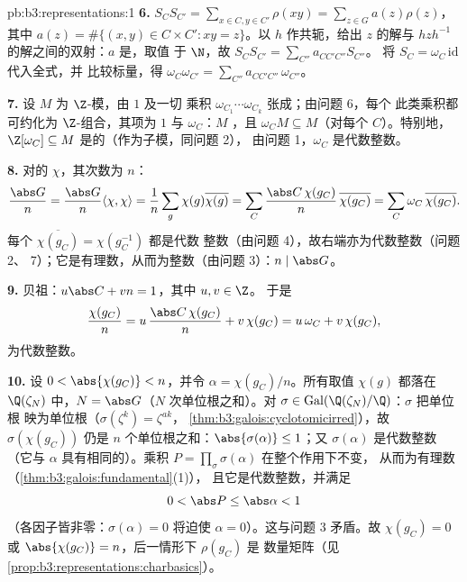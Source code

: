 \begin{solution}{pb:b3:representations:1}
\textbf{6.} $S_CS_{C'} = \sum_{x \in C, y \in C'}\rho(xy) =
\sum_{z \in G} a(z)\rho(z)$，其中 $a(z) = \#\{(x,y) \in C\times
C' : xy = z\}$。以 $h$ 作共轭，给出 $z$ 的解与
$hzh^{-1}$ 的解之间的双射：$a$ 是，取值
于 $\N$，故 $S_CS_{C'} = \sum_{C''}a_{CC'C''}S_{C''}$。
将 $S_C = \omega_C\,\mathrm{id}$ 代入全式，并
比较标量，得
$\omega_C\omega_{C'} = \sum_{C''}a_{CC'C''}\,\omega_{C''}$。

\textbf{7.} 设 $M$ 为 $\Z$-模，由 $1$ 及一切
乘积 $\omega_{C_1}\cdots\omega_{C_k}$ 张成；由问题 6，每个
此类乘积都可约化为 $\Z$-组合，其项为 $1$ 与
$\omega_C$：$M$ ，且 $\omega_C M
\subseteq M$（对每个 $C$）。特别地，$\Z[\omega_C]
\subseteq M$ 是的（作为子模，同问题 2），
由问题 1，$\omega_C$ 是代数整数。

\textbf{8.} 对的 $\chi$，其次数为 $n$：
\[
\frac{\abs G}{n} = \frac{\abs G}{n}\langle\chi,\chi\rangle
= \frac1n \sum_{g}\chi(g)\overline{\chi(g)}
= \sum_{C}\frac{\abs C\,\chi(g_C)}{n}\,\overline{\chi(g_C)}
= \sum_C \omega_C\,\overline{\chi(g_C)} .
\]
每个 $\overline{\chi(g_C)} = \chi(g_C^{-1})$ 都是代数
整数（由问题 4），故右端亦为代数整数（问题 2、
7）；它是有理数，从而为整数（由问题 3）：$n \mid \abs
G$。

\textbf{9.} 贝祖：$u\abs C + vn = 1$，其中 $u, v \in \Z$。
于是
\[
\frac{\chi(g_C)}{n} = u\,\frac{\abs C\,\chi(g_C)}{n} +
v\,\chi(g_C) = u\,\omega_C + v\,\chi(g_C),
\]
为代数整数。

\textbf{10.} 设 $0 < \abs{\chi(g_C)} < n$，并令 $\alpha
= \chi(g_C)/n$。所有取值 $\chi(g)$ 都落在 $\Q(\zeta_N)$ 中，$N =
\abs G$（$N$ 次单位根之和）。对 $\sigma \in
\operatorname{Gal}(\Q(\zeta_N)/\Q)$：$\sigma$ 把单位根
映为单位根（$\sigma(\zeta^k) = \zeta^{ak}$，
\cref{thm:b3:galois:cyclotomicirred}），故 $\sigma(\chi(g_C))$
仍是 $n$ 个单位根之和：$\abs{\sigma(\alpha)}
\leq 1$；又 $\sigma(\alpha)$ 是代数整数（它与
$\alpha$ 具有相同的）。乘积 $P =
\prod_\sigma \sigma(\alpha)$ 在整个作用下不变，
从而为有理数（\cref{thm:b3:galois:fundamental}(1)），
且它是代数整数，并满足
\[
0 < \abs P \leq \abs\alpha < 1
\]
（各因子皆非零：$\sigma(\alpha) = 0$ 将迫使 $\alpha =
0$）。这与问题 3 矛盾。故 $\chi(g_C) = 0$ 或
$\abs{\chi(g_C)} = n$，后一情形下 $\rho(g_C)$ 是
数量矩阵（见\cref{prop:b3:representations:charbasics}）。


\end{solution}
